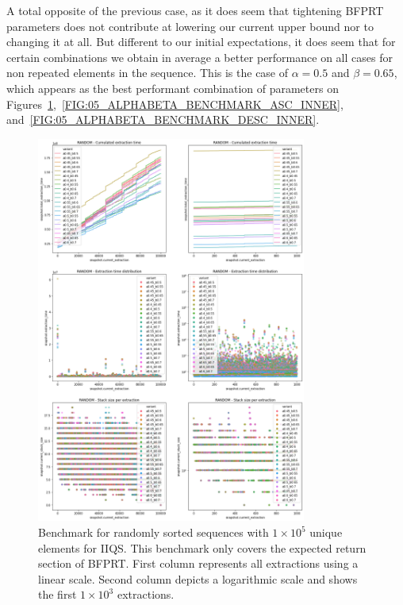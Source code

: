 A total opposite of the previous case, as it does seem that tightening BFPRT parameters does not contribute at lowering our current upper bound nor to changing it at all. But different to our initial expectations, it does seem that for certain combinations we obtain in average a better performance on all cases for non repeated elements in the sequence. This is the case of $\alpha=0.5$ and $\beta=0.65$, which appears as the best performant combination of parameters on Figures~\ref{FIG:05_ALPHABETA_BENCHMARK_RANDOM_INNER},~\ref{FIG:05_ALPHABETA_BENCHMARK_ASC_INNER}, and~\ref{FIG:05_ALPHABETA_BENCHMARK_DESC_INNER}. 


\begin{figure}[p]
    \centering
    \includegraphics[width=0.79\textwidth]{./fragments/04_experimental_execution/images/04_alphabeta_detail_random_inner.png}
    \caption{Benchmark for randomly sorted sequences with $1\times10^5$ unique elements for IIQS. This benchmark only covers the expected return section of BFPRT. First column represents all extractions using a linear scale. Second column depicts a logarithmic scale and shows the first $1\times10^3$ extractions. }
    \label{FIG:05_ALPHABETA_BENCHMARK_RANDOM_INNER}
\end{figure}

